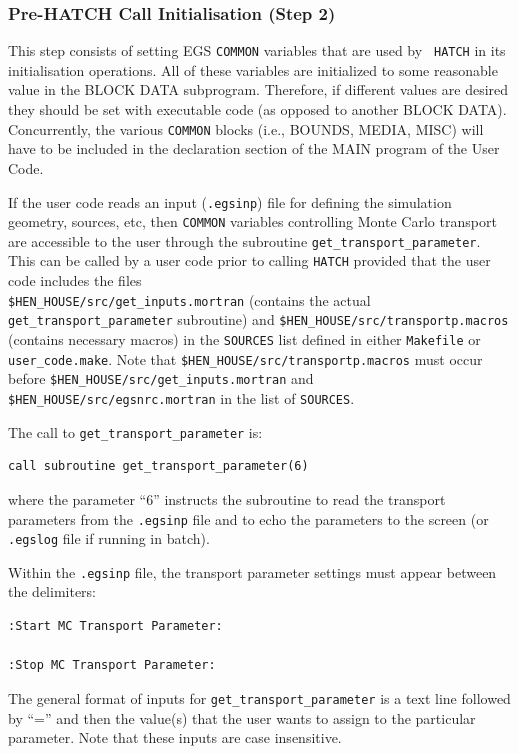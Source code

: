 \subsubsection{Pre-HATCH Call Initialisation (Step 2)}
\label{step_2}

This step consists of setting EGS {\tt COMMON} variables that are used by {\tt
HATCH}
in its initialisation operations.  All of these variables are initialized
to some reasonable value in the BLOCK DATA subprogram.  Therefore, if
different values are desired they should be set with executable code (as
opposed to another BLOCK DATA).  Concurrently, the various {\tt COMMON} blocks
(i.e., BOUNDS, MEDIA, MISC) will have to be included in the declaration
section of the MAIN program of the User Code.

If the user code reads an input ({\tt .egsinp}) file for defining
the simulation geometry, sources, etc, then
{\tt COMMON} variables controlling Monte Carlo transport are accessible to the user
through the subroutine {\tt get\_transport\_parameter}.  This can
be called by a user code prior to calling {\tt HATCH} provided that
the user code includes the files\\
 {\tt \$HEN\_HOUSE/src/get\_inputs.mortran}
(contains the actual {\tt get\_transport\_parameter} subroutine) and
{\tt \$HEN\_HOUSE/src/transportp.macros} (contains necessary macros)
in the {\tt SOURCES} list defined in either {\tt Makefile} or
{\tt user\_code.make}.
Note that {\tt \$HEN\_HOUSE/src/transportp.macros} must occur before
{\tt \$HEN\_HOUSE/src/get\_inputs.mortran} and
{\tt \$HEN\_HOUSE/src/egsnrc.mortran} in the list of {\tt SOURCES}.

The call to {\tt get\_transport\_parameter} is:
\begin{verbatim}
call subroutine get_transport_parameter(6)
\end{verbatim}
where the parameter ``6'' instructs the subroutine to read the
transport parameters from the {\tt .egsinp} file and to echo the parameters
to the screen (or {\tt .egslog} file if running in batch).

Within the {\tt .egsinp} file, the transport parameter settings must
appear between the delimiters:
\begin{verbatim}
:Start MC Transport Parameter:

:Stop MC Transport Parameter:
\end{verbatim}

The general format of inputs for {\tt get\_transport\_parameter} is
a text line followed by ``='' and then the value(s) that the user
wants to assign to the particular parameter.  Note that
these inputs are case insensitive.

